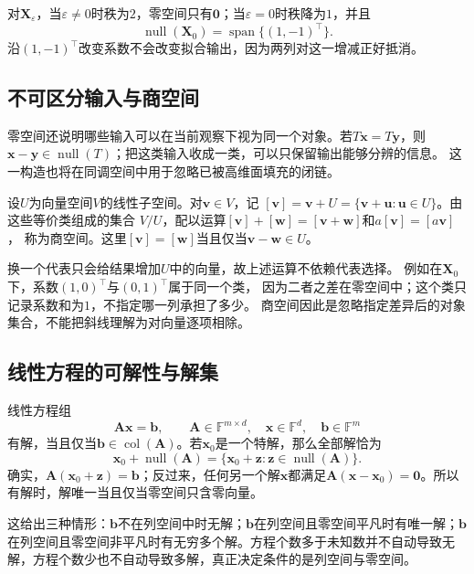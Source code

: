 对$\bm{X}_{\varepsilon}$，当$\varepsilon\neq0$时秩为$2$，零空间只有$\bm{0}$；当$\varepsilon=0$时秩降为$1$，并且
\[
  \operatorname{null}(\bm{X}_0)
  =
  \operatorname{span}\{(1,-1)^{\top}\}.
\]
沿$(1,-1)^{\top}$改变系数不会改变拟合输出，因为两列对这一增减正好抵消。

\subsection{不可区分输入与商空间}

零空间还说明哪些输入可以在当前观察下视为同一个对象。若$T\bm x=T\bm y$，则
$\bm x-\bm y\in\operatorname{null}(T)$；把这类输入收成一类，可以只保留输出能够分辨的信息。
这一构造也将在同调空间中用于忽略已被高维面填充的闭链。

\begin{definition}[线性空间的商空间]
\label{def:linear-algebra-quotient-space}
设$U$为向量空间$V$的线性子空间。对$\bm v\in V$，记
$[\bm v]=\bm v+U=\{\bm v+\bm u:\bm u\in U\}$。由这些等价类组成的集合
$V/U$，配以运算$[\bm v]+[\bm w]=[\bm v+\bm w]$和$a[\bm v]=[a\bm v]$，
称为商空间。这里$[\bm v]=[\bm w]$当且仅当$\bm v-\bm w\in U$。
\end{definition}
换一个代表只会给结果增加$U$中的向量，故上述运算不依赖代表选择。
例如在$\bm X_0$下，系数$(1,0)^{\top}$与$(0,1)^{\top}$属于同一个类，
因为二者之差在零空间中；这个类只记录系数和为$1$，不指定哪一列承担了多少。
商空间因此是忽略指定差异后的对象集合，不能把斜线理解为对向量逐项相除。

\subsection{线性方程的可解性与解集}

线性方程组
\begin{equation}
  \bm{A}\bm{x}=\bm{b}, \qquad \bm{A}\in\mathbb{F}^{m\times d}, \quad \bm{x}\in\mathbb{F}^d, \quad \bm{b}\in\mathbb{F}^m \label{eq:linear-algebra-linear-system}
\end{equation}
有解，当且仅当$\bm{b}\in\operatorname{col}(\bm{A})$。若$\bm{x}_0$是一个特解，那么全部解恰为
\[
  \bm{x}_0+\operatorname{null}(\bm{A})
  =
  \{\bm{x}_0+\bm{z}:\bm{z}\in\operatorname{null}(\bm{A})\}.
\]
确实，$\bm{A}(\bm{x}_0+\bm{z})=\bm{b}$；反过来，任何另一个解$\bm{x}$都满足$\bm{A}(\bm{x}-\bm{x}_0)=\bm{0}$。所以有解时，解唯一当且仅当零空间只含零向量。

这给出三种情形：$\bm{b}$不在列空间中时无解；$\bm{b}$在列空间且零空间平凡时有唯一解；$\bm{b}$在列空间且零空间非平凡时有无穷多个解。方程个数多于未知数并不自动导致无解，方程个数少也不自动导致多解，真正决定条件的是列空间与零空间。

